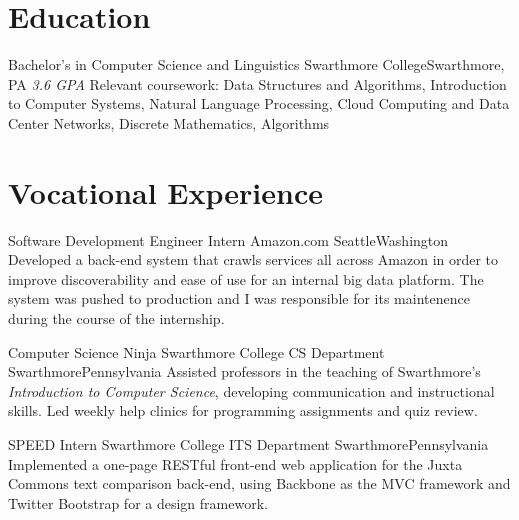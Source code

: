 \documentclass[11pt,letterpaper,sans]{moderncv}    %
\begin{document}


\clearpage

\makecvtitle

\section{Education}
        {Bachelor's in Computer Science and Linguistics}
        {Swarthmore College}{Swarthmore, PA}
        {\textit{3.6 GPA}}
        {Relevant coursework: Data Structures and Algorithms, 
                              Introduction to Computer Systems, 
                              Natural Language Processing, 
                              Cloud Computing and Data Center Networks,
                              Discrete Mathematics,
                              Algorithms}

\section{Vocational Experience}

        {Software Development Engineer Intern}
        {Amazon.com}
        {Seattle}{Washington}
        {Developed a back-end system that crawls services all across Amazon in
          order to improve discoverability and ease of use for an
          internal big data platform. The system was pushed to
          production and I was responsible for its maintenence during
          the course of the internship.}

        {Computer Science Ninja}
        {Swarthmore College CS Department}
        {Swarthmore}{Pennsylvania}
        {Assisted professors in the teaching of Swarthmore's
          \emph{Introduction to Computer Science}, developing
          communication and instructional skills. \newline{}Led weekly
          help clinics for programming assignments and quiz review.}

        {SPEED Intern}
        {Swarthmore College ITS Department}
        {Swarthmore}{Pennsylvania}
        {Implemented a one-page RESTful front-end web application for
          the Juxta Commons text comparison back-end, using Backbone
          as the MVC framework and Twitter Bootstrap for a design
          framework.}
\end{document}
